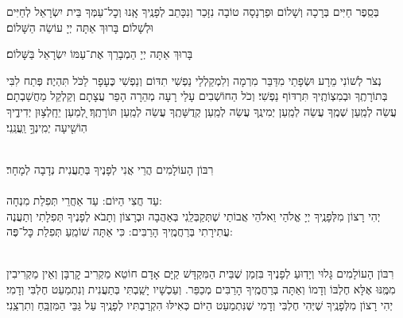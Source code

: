 \documentclass[twoside, openany, parskip=half, 11pt]{book}
\begin{document}
\begin{paracol}{2}
\begin{small}
בְּסֵֽפֶר חַיִּים בְּרָכָה וְשָׁלוֹם וּפַרְנָסָה טוֹבָה נִזָּכֵר וְנִכָּתֵב לְפָנֶֽיךָ אָֽנוּ וְכׇל־עַמְּךָ בֵּית יִשְׂרָאֵל לְחַיִּים וּלְשָׁלוֹם׃ בָּרוּךְ אַתָּה יְיָ עוֹשֵׂה הַשָּׁלוֹם׃

\end{small}
\switchcolumn
בָּרוּךְ אַתָּה יְיָ הַמְבָרֵךְ אֶת־עַמּוֹ יִשְׂרָאֵל בַּשָּׁלוֹם׃

\end{paracol}

נְצֹר לְשׁוֹנִי מֵרָע וּשְׂפָתַי מִדַּבֵּר מִרְמָה וְלִמְקַלְלַי נַפְשִׁי תִדּוֹם וְנַפְשִׁי כֶּעָפָר לַכֹּל תִּהְיֶה׃ פְּתַח לִבִּי בְּתוֹרָתֶֽךָ וּבְמִצְוֹתֶֽיךָ תִּרְדּוֹף נַפְשִׁי׃ וְכֹל הַחוֹשְׁבִים עָלַי רָעָה מְהֵרָה הָפֵר עֲצָתָם וְקַלְקֵל מַחֲשַׁבְתָם׃ עֲשֵׂה לְמַֽעַן שְׁמֶֽךָ עֲשֵׂה לְמַֽעַן יְמִינֶֽךָ עֲשֵׂה לְמַֽעַן קְדֻשָּׁתֶֽךָ עֲשֵׂה לְמַֽעַן תּוֹרָתֶֽךָ׃ לְ֭מַעַן יֵחָֽלְצ֥וּן יְדִידֶ֑יךָ הֽוֹשִׁ֖יעָה יְמִֽינְךָ֣ וַֽעֲנֵֽנִי׃

\begin{sometimes}

\\
רִבּוֹן הָעוֹלָמִים הֲרֵי אֲנִי לְפָנֶיךָ בְּתַעֲנִית נְדָבָה לְמָחָר׃\\
\\
עַד חֲצִי הַיּוֹם:  עַד אַחֲרֵי תְּפִלַת מִנְחָה:\\
יְהִי רָצוֹן מִלְּפָנֶֽיךָ יְיָ אֱלֹהַי וֵאלֹהֵי אֲבוֹתַי שֶׁתְּקַבְּלֵֽנִי בְּאַהֲבָה וּבְרָצוֹן וְתָבֹא לְפָנֶיךָ תְּפִלָתִי
וְתַעֲנֶה עֲתִירָתִי בְּרַחֲמֶֽיךָ הָרַבִּים: כִּי אַתָּה שׁוֹמֵֽעַ תְּפִלַת כׇּל־פֶּה: 

\sepline

\\
רִבּוֹן הָעוֹלָמִים גָּלוּי וְיָדֽוּעַ לְפָנֶיךָ בִּזְמַן שֶׁבֵּית הַמִּקְדָּשׁ קַיָּם אָדָם חוֹטֵא מַקְרִיב קׇרְבָּן וְאֵין מַקְרִיבִין מִמֶּֽנּוּ אֶלָּא חֶלְבּוֹ וְדָמוֹ וְאַתָּה בְּרַחֲמֶֽיךָ הָרַבִּים מְכַפֵּר. וְעַכְשָׁיו יָשַֽׁבְתִּי בְּתַעֲנִית וְנִתְמַעֵט חֶלְבִּי וְדָמִי׃ יְהִי רָצוֹן מִלְּפָנֶֽיךָ שֶׁיְּהִי חֶלְבִּי וְדָמִי שֶׁנִּתְמַעַט הַיּוֹם כְּאִילּוּ הִקְרַבְתִּיו לְפָנֶֽיךָ עַל גַּבֵּי הַמִּזְבֵּֽחַ וְתִרְצֵֽנִי׃


\end{sometimes}
\end{document}
